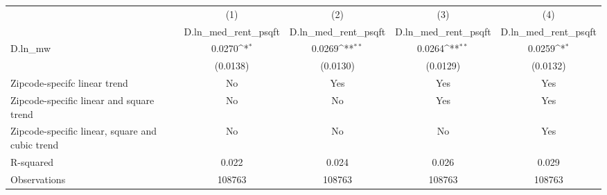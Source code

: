 {
\def\sym#1{\ifmmode^{#1}\else\(^{#1}\)\fi}
\begin{tabular}{l*{4}{c}}
\hline\hline
          &\multicolumn{1}{c}{(1)}&\multicolumn{1}{c}{(2)}&\multicolumn{1}{c}{(3)}&\multicolumn{1}{c}{(4)}\\
          &\multicolumn{1}{c}{D.ln\_med\_rent\_psqft}&\multicolumn{1}{c}{D.ln\_med\_rent\_psqft}&\multicolumn{1}{c}{D.ln\_med\_rent\_psqft}&\multicolumn{1}{c}{D.ln\_med\_rent\_psqft}\\
\hline
D.ln\_mw   &   0.0270\sym{*}  &   0.0269\sym{**} &   0.0264\sym{**} &   0.0259\sym{*}  \\
          & (0.0138)         & (0.0130)         & (0.0129)         & (0.0132)         \\
\hline
Zipcode-specifc linear trend&       No         &      Yes         &      Yes         &      Yes         \\
Zipcode-specific linear and square trend&       No         &       No         &      Yes         &      Yes         \\
Zipcode-specific linear, square and cubic trend&       No         &       No         &       No         &      Yes         \\
R-squared &    0.022         &    0.024         &    0.026         &    0.029         \\
Observations&   108763         &   108763         &   108763         &   108763         \\
\hline\hline
\end{tabular}
}
